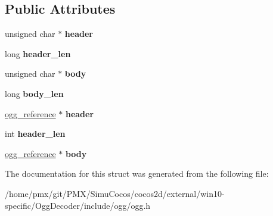 \subsection*{Public Attributes}
\begin{DoxyCompactItemize}
\item 
\mbox{\label{structogg__page_acc3e10f279fe5687287c73d36a8892db}} 
unsigned char $\ast$ {\bfseries header}
\item 
\mbox{\label{structogg__page_aeaa6edc2ff9f2c5cc8f0ecf001936b7b}} 
long {\bfseries header\+\_\+len}
\item 
\mbox{\label{structogg__page_a916ba52eea170500dea6ff3f016e7c94}} 
unsigned char $\ast$ {\bfseries body}
\item 
\mbox{\label{structogg__page_ac6e649f0001899b512935448a903abac}} 
long {\bfseries body\+\_\+len}
\item 
\mbox{\label{structogg__page_a882bcd0096ccd78eb890c825eaac5635}} 
\hyperlink{structogg__reference}{ogg\+\_\+reference} $\ast$ {\bfseries header}
\item 
\mbox{\label{structogg__page_a3fde5807ee4533b2c4dfe4251c553d53}} 
int {\bfseries header\+\_\+len}
\item 
\mbox{\label{structogg__page_ab00add7ada722d148e613bf079b1d0bc}} 
\hyperlink{structogg__reference}{ogg\+\_\+reference} $\ast$ {\bfseries body}
\end{DoxyCompactItemize}


The documentation for this struct was generated from the following file\+:\begin{DoxyCompactItemize}
\item 
/home/pmx/git/\+P\+M\+X/\+Simu\+Cocos/cocos2d/external/win10-\/specific/\+Ogg\+Decoder/include/ogg/ogg.\+h\end{DoxyCompactItemize}
